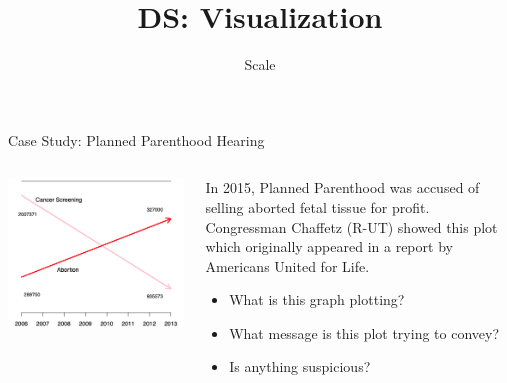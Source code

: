 \documentclass[aspectratio=169]{../latex_main/tntbeamer}  %
\title[Visualization]{DS: Visualization}
\subtitle{Scale}
\begin{document}
	
	\maketitle
	\begin{frame}{Case Study: Planned Parenthood Hearing}
	    \begin{columns}
	        \begin{column}{.5\textwidth}
	        
	                    \centering
	                    \includegraphics[scale=.65]{Bild51}
	        \end{column}
	        
	        \begin{column}{.5\textwidth}
	        
	                In 2015, Planned Parenthood was accused of selling aborted fetal tissue for profit.\\
	                Congressman Chaffetz (R-UT) showed this plot which originally appeared in a report by Americans United for Life.
	                \begin{itemize}
	                    \item What is this graph plotting?
	                    \item What message is this plot trying to convey?
	                    \item Is anything suspicious?	
	                \end{itemize}
	                
	        \end{column}
	    \end{columns}
	\end{frame}
	
\end{document}
